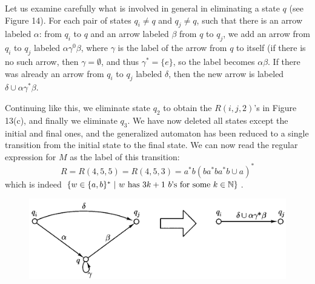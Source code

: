 \begin{examplebreak}{}
  \quad Let us examine carefully what is involved in general in eliminating a state $q$ (see Figure 14). For each pair of states $q_i \neq q$ and $q_j \neq q$, such that there is an arrow labeled $\alpha$: from $q_i$ to $q$ and an arrow labeled $\beta$ from $q$ to $q_j$, we add an arrow from $q_i$ to $q_j$ labeled $\alpha \gamma^0 \beta$, where $\gamma$ is the label of the arrow from $q$ to itself (if there is no such arrow, then $\gamma = \emptyset$, and thus $\gamma^* = \{e\}$, so the label becomes $\alpha \beta$. If there was already an arrow from $q_i$ to $q_j$ labeled $\delta$, then the new arrow is labeled $\delta \cup \alpha \gamma^* \beta$.

  \quad Continuing like this, we eliminate state $q_2$ to obtain the $R(i, j, 2)$'s in Figure 13(c), and finally we eliminate $q_3$. We have now deleted all states except the initial and final ones, and the generalized automaton has been reduced to a single transition from the initial state to the final state. We can now read the regular expression for $M$ as the label of this transition:
  \begin{equation*}
    R = R(4, 5, 5) = R(4, 5, 3) = a^* b (b a^* b a^* b \cup a)^*
  \end{equation*}
  which is indeed $\left\{ w \in \{a,b\}^*\ |\ w \textnormal{ has } 3k + 1\ b\textnormal{'s for some } k \in \mathbb{N}  \right\}$.
\end{examplebreak}

\begin{figure}[b]
  \centering
  \includegraphics[width=.42\textwidth]{img/Fig2.17.png}
  \caption{}
\end{figure}
